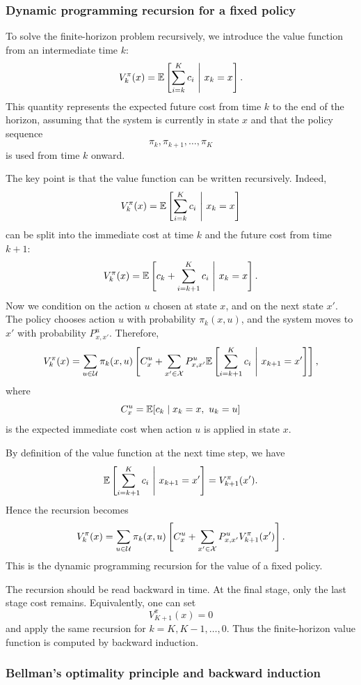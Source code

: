 \subsubsection{Dynamic programming recursion for a fixed policy}

To solve the finite-horizon problem recursively, we introduce the value function from an
intermediate time \(k\):
\[
V_k^\pi(x)
=
\mathbb{E}\left[
\sum_{i=k}^{K} c_i
\ \middle|\ x_k=x
\right].
\]
This quantity represents the expected future cost from time \(k\) to the end of the horizon,
assuming that the system is currently in state \(x\) and that the policy sequence
\[
\pi_k,\pi_{k+1},\dots,\pi_K
\]
is used from time \(k\) onward.

The key point is that the value function can be written recursively. Indeed,
\[
V_k^\pi(x)
=
\mathbb{E}\left[
\sum_{i=k}^{K} c_i
\ \middle|\ x_k=x
\right]
\]
can be split into the immediate cost at time \(k\) and the future cost from time \(k+1\):
\[
V_k^\pi(x)
=
\mathbb{E}\left[
c_k+\sum_{i=k+1}^{K} c_i
\ \middle|\ x_k=x
\right].
\]
Now we condition on the action \(u\) chosen at state \(x\), and on the next state \(x'\). The
policy chooses action \(u\) with probability \(\pi_k(x,u)\), and the system moves to \(x'\) with
probability \(P^u_{x,x'}\). Therefore,
\[
V_k^\pi(x)
=
\sum_{u\in\mathcal{U}}\pi_k(x,u)
\left[
C_x^u
+
\sum_{x'\in\mathcal{X}}P^u_{x,x'}
\mathbb{E}\left[
\sum_{i=k+1}^{K}c_i
\ \middle|\ x_{k+1}=x'
\right]
\right],
\]
where
\[
C_x^u
=
\mathbb{E}[c_k\mid x_k=x,\ u_k=u]
\]
is the expected immediate cost when action \(u\) is applied in state \(x\).

By definition of the value function at the next time step, we have
\[
\mathbb{E}\left[
\sum_{i=k+1}^{K}c_i
\ \middle|\ x_{k+1}=x'
\right]
=
V_{k+1}^\pi(x').
\]
Hence the recursion becomes
\[
V_k^\pi(x)
=
\sum_{u\in\mathcal{U}}\pi_k(x,u)
\left[
C_x^u
+
\sum_{x'\in\mathcal{X}}P^u_{x,x'}V_{k+1}^\pi(x')
\right].
\]
This is the dynamic programming recursion for the value of a fixed policy.

The recursion should be read backward in time. At the final stage, only the last stage cost
remains. Equivalently, one can set
\[
V_{K+1}^\pi(x)=0
\]
and apply the same recursion for \(k=K,K-1,\dots,0\). Thus the finite-horizon value function is
computed by backward induction.

\subsubsection{Bellman's optimality principle and backward induction}

